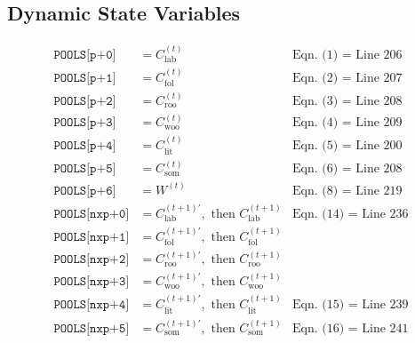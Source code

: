 \documentclass{article}
\begin{document}
		\subsection{Dynamic State Variables}
			\begin{align*}
				\texttt{POOLS[p+0]} &= C_\text{lab}^{(t)} & \text{Eqn. (1) = Line 206}\\
				\texttt{POOLS[p+1]} &= C_\text{fol}^{(t)} & \text{Eqn. (2) = Line 207}\\
				\texttt{POOLS[p+2]} &= C_\text{roo}^{(t)} & \text{Eqn. (3) = Line 208}\\
				\texttt{POOLS[p+3]} &= C_\text{woo}^{(t)} & \text{Eqn. (4) = Line 209}\\
				\texttt{POOLS[p+4]} &= C_\text{lit}^{(t)} & \text{Eqn. (5) = Line 200}\\
				\texttt{POOLS[p+5]} &= C_\text{som}^{(t)} & \text{Eqn. (6) = Line 208}\\
				\texttt{POOLS[p+6]} &= W^{(t)} & \text{Eqn. (8) = Line 219}\\
				\texttt{POOLS[nxp+0]} &= C_\text{lab}^{(t+1)'},\text{ then }C_\text{lab}^{(t+1)} & \text{Eqn. (14) = Line 236}\\
				\texttt{POOLS[nxp+1]} &= C_\text{fol}^{(t+1)'},\text{ then }C_\text{fol}^{(t+1)}\\
				\texttt{POOLS[nxp+2]} &= C_\text{roo}^{(t+1)'},\text{ then }C_\text{roo}^{(t+1)}\\
				\texttt{POOLS[nxp+3]} &= C_\text{woo}^{(t+1)'},\text{ then }C_\text{woo}^{(t+1)}\\
				\texttt{POOLS[nxp+4]} &= C_\text{lit}^{(t+1)'},\text{ then }C_\text{lit}^{(t+1)} & \text{Eqn. (15) = Line 239}\\
				\texttt{POOLS[nxp+5]} &= C_\text{som}^{(t+1)'},\text{ then }C_\text{som}^{(t+1)} & \text{Eqn. (16) = Line 241}
			\end{align*}
\end{document}
